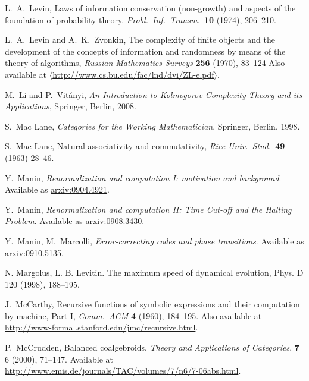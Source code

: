 \documentclass[12pt,twoside,openright]{report}
\begin{document}
\begin{thebibliography}{99}
 L.\ A.\ Levin, Laws of information conservation
(non-growth) and aspects of the foundation of probability theory.
\textit{Probl.\ Inf.\ Transm.\ }\textbf{10} (1974),
206--210.

 L.\ A.\ Levin and A.\ K.\ Zvonkin, The complexity of finite objects and the development of the concepts of information and randomness by means of the theory of algorithms, 
\textsl{Russian Mathematics Surveys} {\bf 256} (1970), 83--124
Also available at \href{http://www.cs.bu.edu/fac/lnd/dvi/ZL-e.pdf}
{$\langle$http://www.cs.bu.edu/fac/lnd/dvi/ZL-e.pdf$\rangle$}.

 M.\ Li and P.\ Vit\'anyi, \textsl{An Introduction to Kolmogorov Complexity Theory and its Applications}, Springer, Berlin, 2008.

 S.\ Mac Lane, {\sl Categories for the Working Mathematician}, Springer, Berlin, 1998.

 S.\ Mac Lane, Natural associativity and commutativity, {\sl Rice Univ.\ Stud.\ }{\bf 49} (1963) 28--46.

 Y.\ Manin, \textsl{Renormalization and computation I: motivation and background}.  Available as
\href{http://arxiv.org/abs/0904.4921}{arxiv:0904.4921}.

 Y.\ Manin, \textsl{Renormalization and computation II: Time Cut-off and the Halting Problem}. Available as
\href{http://arxiv.org/abs/0908.3430}{arxiv:0908.3430}.

 Y.\ Manin, M.\ Marcolli, \textsl{Error-correcting codes and phase transitions}. Available as
\href{http://arxiv.org/abs/0910.5135}{arxiv:0910.5135}.

 N. Margolus, L. B. Levitin. The maximum speed of dynamical evolution, Phys. D 120 (1998), 188--195.

 J.\ McCarthy, Recursive functions of symbolic expressions and their computation by machine, Part I, 
{\sl Comm.\ ACM} {\bf 4} (1960), 184--195.  Also available at 
\href{http://www-formal.stanford.edu/jmc/recursive.html}
{http://www-formal.stanford.edu/jmc/recursive.html}.

 P.\ McCrudden, Balanced coalgebroids, \textsl{Theory and Applications of Categories}, \textbf{7} 6 (2000), 71--147.  Available at \href{http://www.emis.de/journals/TAC/volumes/7/n6/7-06abs.html}{http://www.emis.de/journals/TAC/volumes/7/n6/7-06abs.html}.


\end{thebibliography}
\end{document}
